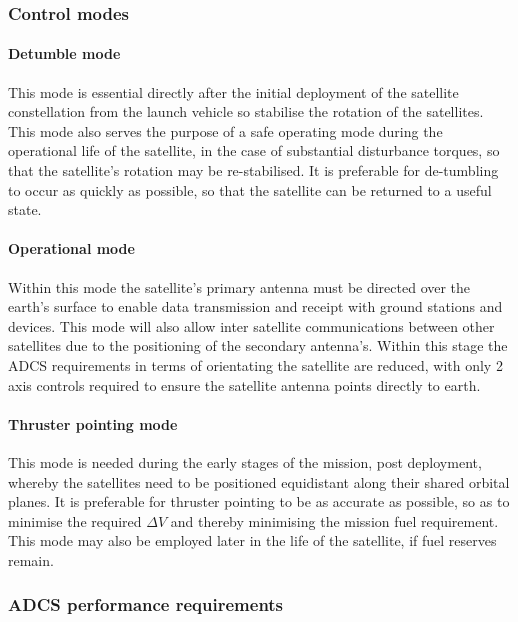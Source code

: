 \subsubsection{Control modes}

\paragraph{Detumble mode}

This mode is essential directly after the initial deployment of the satellite
constellation from the launch vehicle so stabilise the rotation of the satellites.
This mode also serves the purpose of a safe operating mode during the operational
life of the satellite, in the case of substantial disturbance torques, so that
the satellite’s rotation may be re-stabilised. It is preferable for de-tumbling
to occur as quickly as possible, so that the satellite can be returned to a useful state.

\paragraph{Operational mode}

Within this mode the satellite’s primary antenna must be directed over the earth’s
surface to enable data transmission and receipt with ground stations and devices.
This mode will also allow inter satellite communications between other satellites
due to the positioning of the secondary antenna’s. Within this stage the ADCS
requirements in terms of orientating the satellite are reduced, with only 2 axis
controls required to ensure the satellite antenna points directly to earth.

\paragraph{Thruster pointing mode}

This mode is needed during the early stages of the mission, post deployment,
whereby the satellites need to be positioned equidistant along their shared orbital
planes. It is preferable for thruster pointing to be as accurate as possible, so
as to minimise the required $\Delta V$ and thereby minimising the mission fuel requirement.
This mode may also be employed later in the life of the satellite, if fuel reserves remain.

\subsubsection{ADCS performance requirements}

